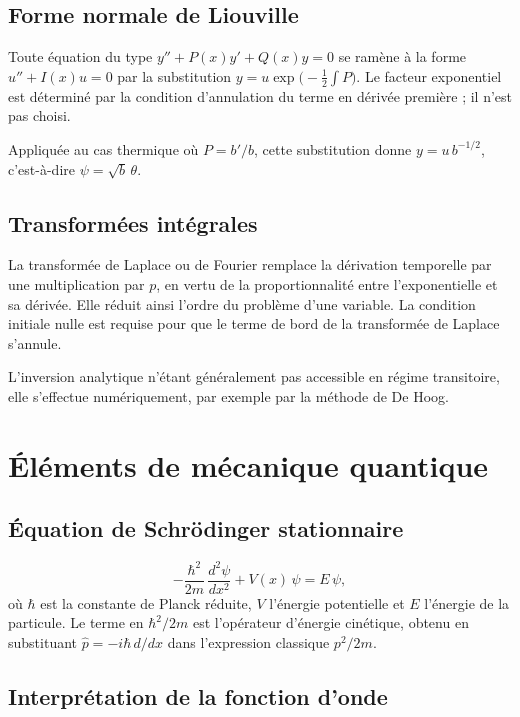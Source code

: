\documentclass[11pt,a4paper]{article}
\begin{document}
\subsection{Forme normale de Liouville}

Toute équation du type $y'' + P(x)y' + Q(x)y = 0$ se ramène à la forme $u'' + I(x)u = 0$ par la
substitution $y = u\exp\bigl(-\tfrac{1}{2}\!\int P\bigr)$. Le facteur exponentiel est déterminé par la
condition d'annulation du terme en dérivée première ; il n'est pas choisi.

Appliquée au cas thermique où $P = b'/b$, cette substitution donne $y = u\,b^{-1/2}$, c'est-à-dire
$\psi = \sqrt{b}\,\theta$.

\subsection{Transformées intégrales}

La transformée de Laplace ou de Fourier remplace la dérivation temporelle par une multiplication par
$p$, en vertu de la proportionnalité entre l'exponentielle et sa dérivée. Elle réduit ainsi l'ordre du
problème d'une variable. La condition initiale nulle est requise pour que le terme de bord de la
transformée de Laplace s'annule.

L'inversion analytique n'étant généralement pas accessible en régime transitoire, elle s'effectue
numériquement, par exemple par la méthode de De Hoog.

\section{Éléments de mécanique quantique}

\subsection{Équation de Schrödinger stationnaire}

\[ -\frac{\hbar^{2}}{2m}\,\frac{d^{2}\psi}{dx^{2}} + V(x)\,\psi = E\,\psi , \]
où $\hbar$ est la constante de Planck réduite, $V$ l'énergie potentielle et $E$ l'énergie de la
particule. Le terme en $\hbar^{2}/2m$ est l'opérateur d'énergie cinétique, obtenu en substituant
$\hat p = -i\hbar\,d/dx$ dans l'expression classique $p^{2}/2m$.

\subsection{Interprétation de la fonction d'onde}
\end{document}

